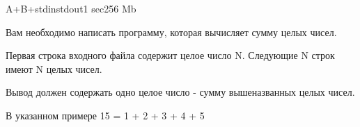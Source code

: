 \begin{problem}{A+B+}{stdin}{stdout}{1 sec}{256 Mb}

Вам необходимо написать программу, которая вычисляет сумму целых чисел.

\InputFile

Первая строка входного файла содержит целое число N. Следующие N строк имеют N целых чисел.

\OutputFile

Вывод должен содержать одно целое число - сумму вышеназванных целых чисел.
\Example

\begin{example}
%
\end{example}

\Note

В указанном примере 15 = 1 + 2 + 3 + 4 + 5

\end{problem}